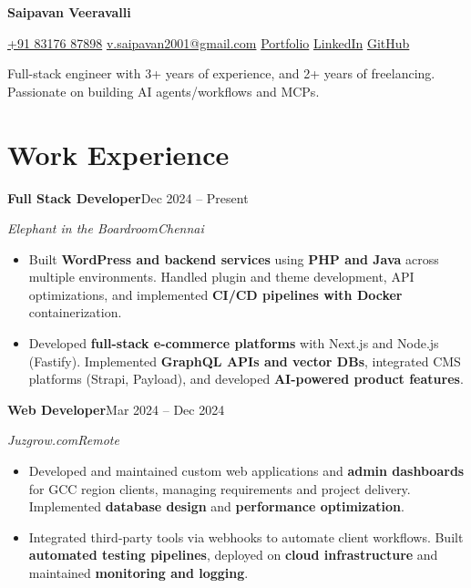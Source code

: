 \documentclass[a4paper,10pt]{article}
\newcommand{\resumeSubheading}[4]{%
  \Needspace{5\baselineskip}%
  \textbf{#1}\hfill #2\par
  \textit{#3}\hfill \textit{#4}\par
}
\newenvironment{resumeItems}{%
  \begin{itemize}[leftmargin=14pt,label=\textbullet,
    labelsep=5pt,topsep=3pt,itemsep=3pt,parsep=0pt,partopsep=0pt]
}{\end{itemize}\vspace{3pt}}
\begin{document}
\begin{center}
  {\fontsize{24}{28}\selectfont\bfseries Saipavan Veeravalli}\par
  \vspace{4pt}
  \href{tel:+918317687898}{+91 83176 87898}\enspace\textbar\enspace
  \href{mailto:v.saipavan2001@gmail.com}{v.saipavan2001@gmail.com}\enspace\textbar\enspace
  \href{https://devshadow.vercel.app/}{Portfolio}\enspace\textbar\enspace
  \href{https://www.linkedin.com/in/saipavan-veeravalli/}{LinkedIn}\enspace\textbar\enspace
  \href{https://github.com/im-shadowpool}{GitHub}
\end{center}
\vspace{-2pt}
\begin{center}
  \small Full-stack engineer with 3+ years of experience, and 2+ years of freelancing. Passionate on building AI agents/workflows and MCPs.
\end{center}\vspace{-4pt}

\section{Work Experience}
\resumeSubheading
  {Full Stack Developer}{Dec 2024 -- Present}
  {Elephant in the Boardroom}{Chennai}
\begin{resumeItems}
  \item Built \textbf{WordPress and backend services} using \textbf{PHP and Java} across multiple environments. Handled plugin and theme development, API optimizations, and implemented \textbf{CI/CD pipelines with Docker} containerization.
  \item Developed \textbf{full-stack e-commerce platforms} with Next.js and Node.js (Fastify). Implemented \textbf{GraphQL APIs and vector DBs}, integrated CMS platforms (Strapi, Payload), and developed \textbf{AI-powered product features}.
\end{resumeItems}

\resumeSubheading
  {Web Developer}{Mar 2024 -- Dec 2024}
  {Juzgrow.com}{Remote}
\begin{resumeItems}
  \item Developed and maintained custom web applications and \textbf{admin dashboards} for GCC region clients, managing requirements and project delivery. Implemented \textbf{database design} and \textbf{performance optimization}.
  \item Integrated third-party tools via webhooks to automate client workflows. Built \textbf{automated testing pipelines}, deployed on \textbf{cloud infrastructure} and maintained \textbf{monitoring and logging}.
\end{resumeItems}
\end{document}
